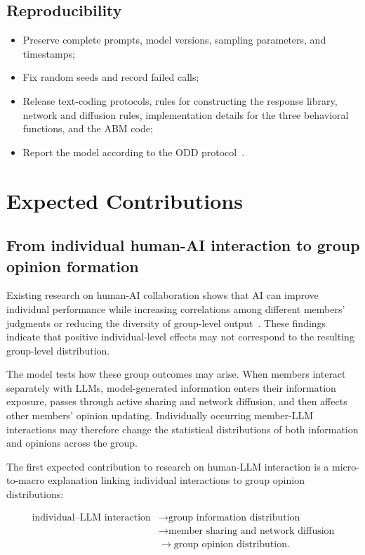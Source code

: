 \documentclass[11pt,a4paper]{article}
\begin{document}
\subsection{Reproducibility}

\begin{itemize}
\item Preserve complete prompts, model versions, sampling parameters, and timestamps;
\item Fix random seeds and record failed calls;
\item Release text-coding protocols, rules for constructing the response library, network and diffusion rules, implementation details for the three behavioral functions, and the ABM code;
\item Report the model according to the ODD protocol~\citep{grimm2020}.
\end{itemize}

\section{Expected Contributions}

\subsection{From individual human-AI interaction to group opinion formation}

Existing research on human-AI collaboration shows that AI can improve individual performance while increasing correlations among different members' judgments or reducing the diversity of group-level output~\citep{fugener2021,doshi2024}. These findings indicate that positive individual-level effects may not correspond to the resulting group-level distribution.

The model tests how these group outcomes may arise. When members interact separately with LLMs, model-generated information enters their information exposure, passes through active sharing and network diffusion, and then affects other members' opinion updating. Individually occurring member-LLM interactions may therefore change the statistical distributions of both information and opinions across the group.

The first expected contribution to research on human-LLM interaction is a micro-to-macro explanation linking individual interactions to group opinion distributions:

\begin{equation*}
\begin{aligned}\text{individual--LLM interaction} &\rightarrow \text{group information distribution} \\
&\rightarrow \text{member sharing and network diffusion} \\
&\rightarrow \text{group opinion distribution}.\end{aligned}
\end{equation*}
\end{document}
